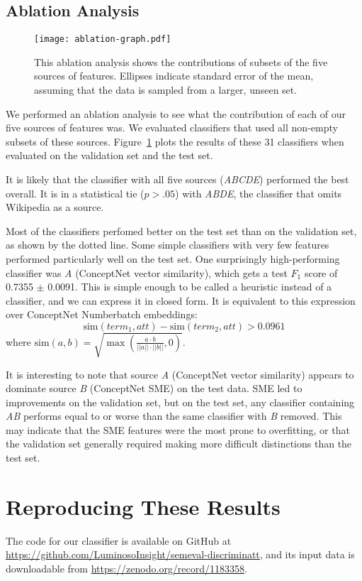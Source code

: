 \documentclass[11pt,a4paper]{article}
\begin{document}
\subsection{Ablation Analysis}

\begin{figure}[t]
\centering
\texttt{[image: ablation-graph.pdf]}
\caption{This ablation analysis shows the contributions of subsets of the
    five sources of features. Ellipses indicate standard error of the mean,
    assuming that the data is sampled from a larger, unseen set.}
\label{fig:ablation}
\end{figure}

We performed an ablation analysis to see what the contribution of each of our
five sources of features was. We evaluated classifiers that used all non-empty
subsets of these sources. Figure~\ref{fig:ablation} plots the results of these
31 classifiers when evaluated on the validation set and the test set.

It is likely that the classifier with all five sources (\emph{ABCDE}) performed the best
overall. It is in a statistical tie ($p > .05$) with \emph{ABDE}, the classifier that
omits Wikipedia as a source.

Most of the classifiers perfomed better on the test set than on the validation
set, as shown by the dotted line. Some simple classifiers with very few
features performed particularly well on the test set. One surprisingly
high-performing classifier was \emph{A} (ConceptNet vector similarity), which
gets a test $F_1$ score of 0.7355 $\pm$ 0.0091. This is simple enough to be
called a heuristic instead of a classifier, and we can express it in closed
form. It is equivalent to this expression over ConceptNet Numberbatch
embeddings: $$ \mathrm{sim}(\mathit{term}_1, \mathit{att}) -
\mathrm{sim}(\mathit{term}_2, \mathit{att}) > 0.0961 $$ where $\mathrm{sim}(a,
b) = \sqrt{\max\left(\frac{a \cdot b}{||a|| \cdot ||b||}, 0\right)}$.

It is interesting to note that source \emph{A} (ConceptNet vector similarity)
appears to dominate source \emph{B} (ConceptNet SME) on the test data. SME led
to improvements on the validation set, but on the test set, any classifier
containing \emph{AB} performs equal to or worse than the same classifier with
\emph{B} removed. This may indicate that the SME features were the most prone
to overfitting, or that the validation set generally required making more
difficult distinctions than the test set.

\section{Reproducing These Results}

The code for our classifier is available on GitHub at
\url{https://github.com/LuminosoInsight/semeval-discriminatt}, and its
input data is downloadable from \url{https://zenodo.org/record/1183358}.



\end{document}
